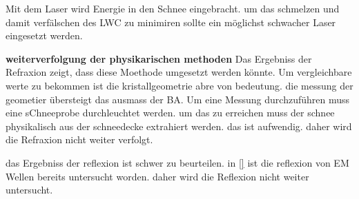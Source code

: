 Mit dem Laser wird Energie in den Schnee eingebracht. um das schmelzen und damit verfälschen des LWC zu minimiren sollte ein möglichst schwacher Laser eingesetzt werden.

\textbf{weiterverfolgung der physikarischen methoden}
Das Ergebniss der Refraxion zeigt, dass diese Moethode umgesetzt werden könnte. Um vergleichbare werte zu bekommen ist die kristallgeometrie abre von bedeutung. die messung der geometier übersteigt das ausmass der BA. Um eine Messung durchzuführen muss eine sChneeprobe durchleuchtet werden. um das zu erreichen muss der schnee physikalisch aus der schneedecke extrahiert werden. das ist aufwendig. daher wird die Refraxion nicht weiter verfolgt.

das Ergebniss der reflexion ist schwer zu beurteilen. in \ref{} ist die reflexion von EM Wellen bereits untersucht worden. daher wird die Reflexion nicht weiter untersucht.


